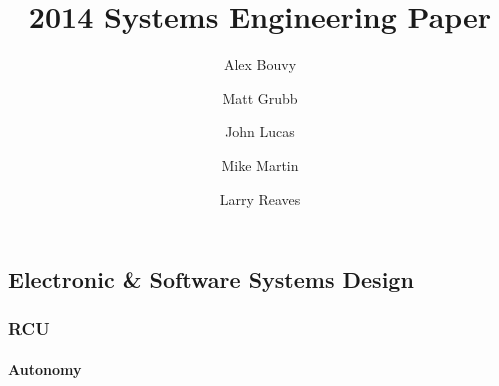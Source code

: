 \documentclass{article}
\begin{document}
\title{2014 Systems Engineering Paper}
\author{Alex Bouvy \and Matt Grubb \and John Lucas \and Mike Martin \and Larry Reaves}
\maketitle
\pagebreak
\tableofcontents
\pagebreak
\begin{multicols}{2}
\part{Electronic \& Software Systems Design}
\section{RCU}
\subsection{Autonomy}



\end{multicols}
\end{document}
